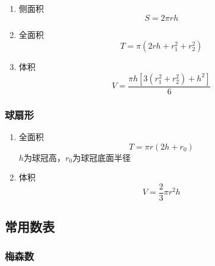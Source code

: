 \documentclass[a4paper]{article}
\begin{document}
\begin{enumerate}
	\item 侧面积
		$$S=2\pi rh$$
	\item 全面积
		$$T=\pi(2rh+r_1^2+r_2^2)$$
	\item 体积
		$$V=\frac{\pi h[3(r_1^2+r_2^2)+h^2]}{6}$$
\end{enumerate}

\subsubsection{球扇形}

\begin{enumerate}
	\item 全面积
		$$T=\pi r(2h+r_0)$$
		$h$为球冠高，$r_0$为球冠底面半径
	\item 体积
		$$V=\frac{2}{3}\pi r^2h$$
\end{enumerate}

\subsection{常用数表}

\subsubsection{梅森数}
\end{document}
